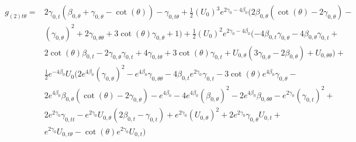 \documentclass[a4paper,11pt]{article}
\numberwithin{equation}{section}
\begin{document}
\begin{subequations}
\begin{align}
\begin{split}
g_{(2) t \theta}=&2 \gamma_{0, t} (\beta_{0, \theta}+\gamma_{0, \theta}-\cot (\theta ))-\gamma_{0, t \theta}+\frac{1}{2} (U_{0})^3 e^{2 \gamma_{0}-4 \beta_{0}} (2 \beta_{0, \theta} (\cot (\theta )-2 \gamma_{0, \theta})-\\
&(\gamma_{0, \theta})^2+2 \gamma_{0, \theta \theta}+3 \cot (\theta ) \gamma_{0, \theta}+1)+\frac{1}{2} (U_{0})^2 e^{2 \gamma_{0}-4 \beta_{0}} (-4 \beta_{0, t} \gamma_{0, \theta}-4 \beta_{0, \theta} \gamma_{0, t}+\\
&2 \cot (\theta ) \beta_{0, t}-2 \gamma_{0, \theta} \gamma_{0, t}+4 \gamma_{0, t \theta}+3 \cot (\theta ) \gamma_{0, t}+U_{0, \theta} (3 \gamma_{0, \theta}-2 \beta_{0, \theta})+U_{0, \theta \theta})+\\
&\frac{1}{2} e^{-4 \beta_{0}} U_{0} (2 e^{4 \beta_{0}} (\gamma_{0, \theta})^2-e^{4 \beta_{0}} \gamma_{0, \theta \theta}-4 \beta_{0, t} e^{2 \gamma_{0}} \gamma_{0, t}-3 \cot (\theta ) e^{4 \beta_{0}} \gamma_{0, \theta}-\\
&2 e^{4 \beta_{0}} \beta_{0, \theta} (\cot (\theta )-2 \gamma_{0, \theta})-e^{4 \beta_{0}}-4 e^{4 \beta_{0}} (\beta_{0, \theta})^2-2 e^{4 \beta_{0}} \beta_{0, \theta \theta}-e^{2 \gamma_{0}} (\gamma_{0, t})^2+\\
&2 e^{2 \gamma_{0}} \gamma_{0, t t}-e^{2 \gamma_{0}} U_{0, \theta} (2 \beta_{0, t}-\gamma_{0, t})+e^{2 \gamma_{0}} (U_{0, \theta})^2+2 e^{2 \gamma_{0}} \gamma_{0, \theta} U_{0, t}+\\
&e^{2 \gamma_{0}} U_{0, t \theta}-\cot (\theta ) e^{2 \gamma_{0}} U_{0, t})
\end{split}
\end{align} 


\end{subequations}
\end{document}
